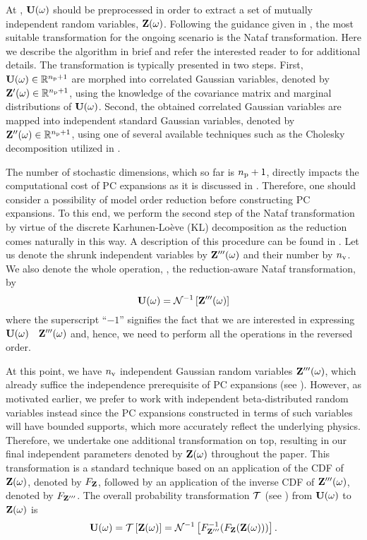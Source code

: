 At , $\mathbf{U}(\omega)$ should be preprocessed in order to extract a set of mutually independent random variables, $\mathbf{Z}(\omega)$.
Following the guidance given in , the most suitable transformation for the ongoing scenario is the Nataf transformation.
Here we describe the algorithm in brief and refer the interested reader to \cite{li2008} for additional details. The transformation is typically presented in two steps.
First, $\mathbf{U}(\omega) \in \mathbb{R}^{{n_\text{p}} + 1}$ are morphed into correlated Gaussian variables, denoted by $\mathbf{Z}'(\omega) \in \mathbb{R}^{{n_\text{p}} + 1}$, using the knowledge of the covariance matrix and marginal distributions of $\mathbf{U}(\omega)$.
Second, the obtained correlated Gaussian variables are mapped into independent standard Gaussian variables, denoted by $\mathbf{Z}''(\omega) \in \mathbb{R}^{{n_\text{p}} + 1}$, using one of several available techniques such as the Cholesky decomposition \cite{press2007} utilized in \cite{li2008}.

The number of stochastic dimensions, which so far is ${n_\text{p}} + 1$, directly impacts the computational cost of PC expansions as it is discussed in .
Therefore, one should consider a possibility of model order reduction before constructing PC expansions.
To this end, we perform the second step of the Nataf transformation by virtue of the discrete Karhunen-Lo\`{e}ve (KL) decomposition \cite{ghanem1991} as the reduction comes naturally in this way.
A description of this procedure can be found in .
Let us denote the shrunk independent variables by $\mathbf{Z}'''(\omega)$ and their number by ${n_\text{v}}$.
We also denote the whole operation, \ie, the reduction-aware Nataf transformation, by
\[
  \mathbf{U}(\omega) = \mathcal{N}^{-1}\left[\mathbf{Z}'''(\omega)\right]
\]
where the superscript ``$-1$'' signifies the fact that we are interested in expressing $\mathbf{U}(\omega)$ \via\ $\mathbf{Z}'''(\omega)$ and, hence, we need to perform all the operations in the reversed order.

At this point, we have ${n_\text{v}}$ independent Gaussian random variables $\mathbf{Z}'''(\omega)$, which already suffice the independence prerequisite of PC expansions (see ).
However, as motivated earlier, we prefer to work with independent beta-distributed random variables instead since the PC expansions constructed in terms of such variables will have bounded supports, which more accurately reflect the underlying physics.
Therefore, we undertake one additional transformation on top, resulting in our final independent parameters denoted by $\mathbf{Z}(\omega)$ throughout the paper.
This transformation is a standard technique \cite{durrett2010} based on an application of the CDF of $\mathbf{Z}(\omega)$, denoted by $F_{\mathbf{Z}}$, followed by an application of the inverse CDF of $\mathbf{Z}'''(\omega)$, denoted by $F_{\mathbf{Z}'''}$.
The overall probability transformation $\oTransform$ (see ) from $\mathbf{U}(\omega)$ to $\mathbf{Z}(\omega)$ is
\[
  \vU(\o) = \oTransform{\vZ(\o)} = \oInvNataf{\fCDF^{-1}_{\vZ'''}(\fCDF_{\vZ}(\vZ(\o)))}.
\]
